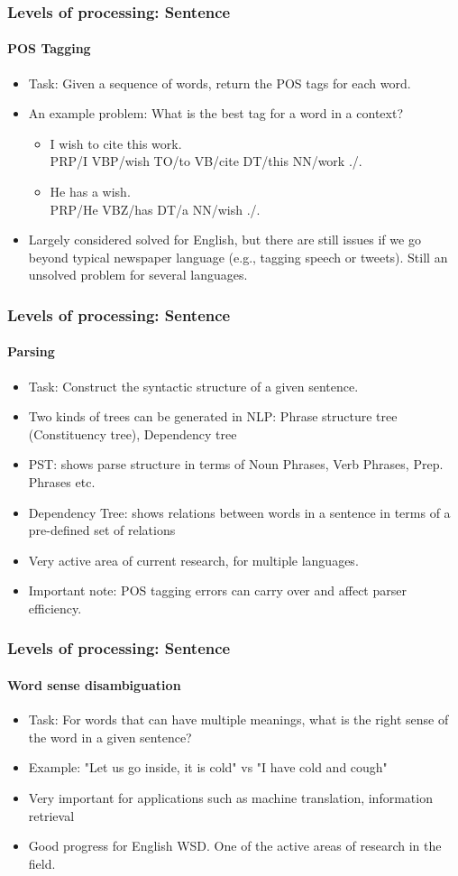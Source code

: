 \documentclass{beamer}
\begin{document}
\begin{frame}
\frametitle{Levels of processing: Sentence}
\framesubtitle{POS Tagging}
\begin{itemize}
\item Task: Given a sequence of words, return the POS tags for each word.
\item An example problem: What is the best tag for a word in a context?
\begin{itemize}
\item I wish to cite this work. 
\\ PRP/I  VBP/wish  TO/to  VB/cite  DT/this  NN/work ./.
\item He has a wish.
\\ PRP/He  VBZ/has  DT/a  NN/wish ./. 
\end{itemize}
\item Largely considered solved for English, but there are still issues if we go beyond typical newspaper language (e.g., tagging speech or tweets). Still an unsolved problem for several languages.
\end{itemize}
\end{frame}

\begin{frame}
\frametitle{Levels of processing: Sentence}
\framesubtitle{Parsing}
\begin{itemize}
\item Task: Construct the syntactic structure of a given sentence.
\item Two kinds of trees can be generated in NLP: Phrase structure tree (Constituency tree), Dependency tree
\item PST: shows parse structure in terms of Noun Phrases, Verb Phrases, Prep. Phrases etc.
\item Dependency Tree: shows relations between words in a sentence in terms of a pre-defined set of relations
\item Very active area of current research, for multiple languages.
\item Important note: POS tagging errors can carry over and affect parser efficiency. 
\end{itemize}
\end{frame}


\begin{frame}
\frametitle{Levels of processing: Sentence}
\framesubtitle{Word sense disambiguation}
\begin{itemize}
\item Task: For words that can have multiple meanings, what is the right sense of the word in a given sentence? 
\item Example: "Let us go inside, it is cold" vs "I have cold and cough"
\item Very important for applications such as machine translation, information retrieval
\item Good progress for English WSD. One of the active areas of research in the field.
\end{itemize}
\end{frame}
\end{document}
